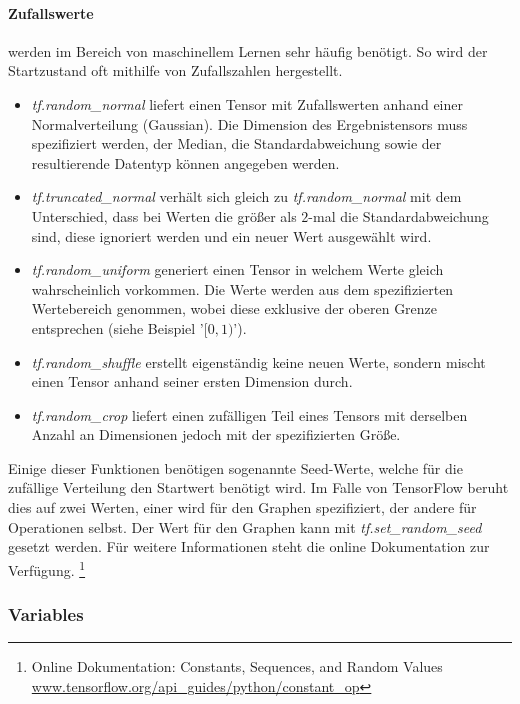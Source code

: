 \paragraph{Zufallswerte} werden im Bereich von maschinellem Lernen sehr häufig benötigt. 
So wird der Startzustand oft mithilfe von Zufallszahlen hergestellt. 

\begin{itemize}
	\item \textit{tf.random\_normal} liefert einen Tensor mit Zufallswerten anhand einer Normalverteilung (Gaussian). 
	Die Dimension des Ergebnistensors muss spezifiziert werden, der Median, die Standardabweichung sowie der resultierende Datentyp können angegeben werden. 
	\item \textit{tf.truncated\_normal} verhält sich gleich zu \textit{tf.random\_normal} mit dem Unterschied, dass bei Werten die größer als $2$-mal die Standardabweichung sind, diese ignoriert werden und ein neuer Wert ausgewählt wird.
	\item \textit{tf.random\_uniform} generiert einen Tensor in welchem Werte gleich wahrscheinlich vorkommen.
	Die Werte werden aus dem spezifizierten Wertebereich genommen, wobei diese exklusive der oberen Grenze entsprechen (siehe Beispiel '$[0, 1)$').
	\item \textit{tf.random\_shuffle} erstellt eigenständig keine neuen Werte, sondern mischt einen Tensor anhand seiner ersten Dimension durch. 
	\item \textit{tf.random\_crop} liefert einen zufälligen Teil eines Tensors mit derselben Anzahl an Dimensionen jedoch mit der spezifizierten Größe.
\end{itemize} \phantom \newline

\noindent
Einige dieser Funktionen benötigen sogenannte Seed-Werte, welche für die zufällige Verteilung den Startwert benötigt wird. 
Im Falle von TensorFlow beruht dies auf zwei Werten, einer wird für den Graphen spezifiziert, der andere für Operationen selbst. 
Der Wert für den Graphen kann mit \textit{tf.set\_random\_seed} gesetzt werden. 
Für weitere Informationen steht die online Dokumentation zur Verfügung. \footnote{Online Dokumentation: Constants, Sequences, and Random Values  \url{www.tensorflow.org/api_guides/python/constant_op}}

\subsubsection{Variables}

